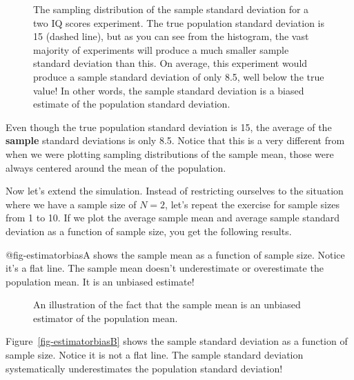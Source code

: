 \documentclass[
  letterpaper,
  DIV=11,
  numbers=noendperiod]{scrreprt}
\begin{document}
\begin{figure}


\caption{\label{fig-sampdistsd}The sampling distribution of the sample
standard deviation for a two IQ scores experiment. The true population
standard deviation is 15 (dashed line), but as you can see from the
histogram, the vast majority of experiments will produce a much smaller
sample standard deviation than this. On average, this experiment would
produce a sample standard deviation of only 8.5, well below the true
value! In other words, the sample standard deviation is a biased
estimate of the population standard deviation.}

\end{figure}%

Even though the true population standard deviation is 15, the average of
the \textbf{sample} standard deviations is only 8.5. Notice that this is
a very different from when we were plotting sampling distributions of
the sample mean, those were always centered around the mean of the
population.

Now let's extend the simulation. Instead of restricting ourselves to the
situation where we have a sample size of \(N=2\), let's repeat the
exercise for sample sizes from 1 to 10. If we plot the average sample
mean and average sample standard deviation as a function of sample size,
you get the following results.

@fig-estimatorbiasA shows the sample mean as a function of sample size.
Notice it's a flat line. The sample mean doesn't underestimate or
overestimate the population mean. It is an unbiased estimate!

\begin{figure}


\caption{\label{fig-estimatorbiasA}An illustration of the fact that the
sample mean is an unbiased estimator of the population mean.}

\end{figure}%

Figure~\ref{fig-estimatorbiasB} shows the sample standard deviation as a
function of sample size. Notice it is not a flat line. The sample
standard deviation systematically underestimates the population standard
deviation!
\end{document}
